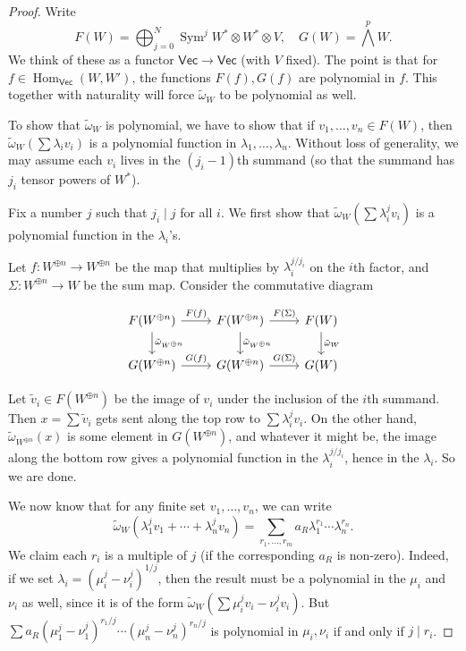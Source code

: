 \documentclass{shortart}
\theoremstyle{definition}
\DeclareMathOperator\Hom{Hom}
\DeclareMathOperator\Sym{Sym}
\newcommand\Vect{\mathsf{Vec}}
\newcommand\exterior{{\textstyle \bigwedge}}
\begin{document}
\begin{proof}
  Write
  \[
    F(W) = \bigoplus_{j = 0}^N \Sym^j W^* \otimes W^* \otimes V,\quad G(W) = \exterior^p W.
  \]
  We think of these as a functor $\Vect \to \Vect$ (with $V$ fixed). The point is that for $f \in \Hom_\Vect(W, W')$, the functions $F(f), G(f)$ are polynomial in $f$. This together with naturality will force $\tilde{\omega}_W$ to be polynomial as well.

  To show that $\tilde{\omega}_W$ is polynomial, we have to show that if $v_1, \ldots, v_n \in F(W)$, then $\tilde{\omega}_W(\sum \lambda_i v_i)$ is a polynomial function in $\lambda_1, \ldots, \lambda_n$. Without loss of generality, we may assume each $v_i$ lives in the $(j_i - 1)$th summand (so that the summand has $j_i$ tensor powers of $W^*$).

  Fix a number  $j$ such that $j_i \mid j$ for all $i$. We first show that $\tilde{\omega}_W(\sum \lambda_i^j v_i)$ is a polynomial function in the $\lambda_i$'s.

  Let $f: W^{\oplus n} \to W^{\oplus n}$ be the map that multiplies by $\lambda_i^{j / j_i}$ on the $i$th factor, and $\Sigma: W^{\oplus n} \to W$ be the sum map. Consider the commutative diagram
  \begin{useimager}
    \[
      \begin{tikzcd}
        F(W^{\oplus n}) \ar[r, "F(f)"] \ar[d, "\tilde{\omega}_{W^{\oplus n}}"] & F(W^{\oplus n}) \ar[r, "F(\Sigma)"]\ar[d, "\tilde{\omega}_{W^{\oplus n}}"] & F(W)\ar[d, "\tilde{\omega}_{W}"] \\
        G(W^{\oplus n}) \ar[r, "G(f)"] & G(W^{\oplus n}) \ar[r, "G(\Sigma)"] & G(W)
      \end{tikzcd}
    \]
  \end{useimager}%

  Let $\tilde{v}_i \in F(W^{\oplus n})$ be the image of $v_i$ under the inclusion of the $i$th summand. Then $x = \sum \tilde{v}_i$ gets sent along the top row to $\sum \lambda_i^j v_i$. On the other hand, $\tilde{\omega}_{W^{\oplus n}}(x)$ is some element in $G(W^{\oplus n})$, and whatever it might be, the image along the bottom row gives a polynomial function in the $\lambda_i^{j/j_i}$, hence in the $\lambda_i$. So we are done.

  We now know that for any finite set $v_1, \ldots, v_n$, we can write
  \[
    \tilde{\omega}_W(\lambda_1^j v_1 + \cdots + \lambda_n^j v_n) = \sum_{r_1, \ldots, r_m} a_R \lambda_1^{r_1} \cdots \lambda_n^{r_n}.
  \]
  We claim each $r_i$ is a multiple of $j$ (if the corresponding $a_R$ is non-zero). Indeed, if we set $\lambda_i = (\mu_i^j - \nu_i^j)^{1/j}$, then the result must be a polynomial in the $\mu_i$ and $\nu_i$ as well, since it is of the form $\tilde{\omega}_W(\sum \mu_i^j v_i - \nu_i^j v_i)$. But $\sum a_R (\mu_1^j - \nu_1^j)^{r_1/ j} \cdots (\mu_n^j - \nu_n^j)^{r_n/ j}$ is polynomial in $\mu_i, \nu_i$ if and only if $j \mid r_i$.


\end{proof}
\end{document}
